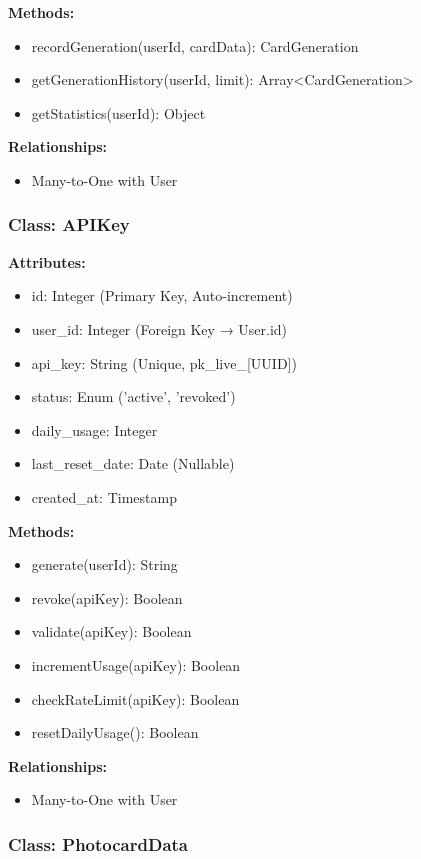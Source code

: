 \documentclass[12pt,a4paper]{article}
\begin{document}
\textbf{Methods:}
\begin{itemize}
    \item recordGeneration(userId, cardData): CardGeneration
    \item getGenerationHistory(userId, limit): Array<CardGeneration>
    \item getStatistics(userId): Object
\end{itemize}

\textbf{Relationships:}
\begin{itemize}
    \item Many-to-One with User
\end{itemize}

\subsubsection{Class: APIKey}

\textbf{Attributes:}
\begin{itemize}
    \item id: Integer (Primary Key, Auto-increment)
    \item user\_id: Integer (Foreign Key → User.id)
    \item api\_key: String (Unique, pk\_live\_[UUID])
    \item status: Enum ('active', 'revoked')
    \item daily\_usage: Integer
    \item last\_reset\_date: Date (Nullable)
    \item created\_at: Timestamp
\end{itemize}

\textbf{Methods:}
\begin{itemize}
    \item generate(userId): String
    \item revoke(apiKey): Boolean
    \item validate(apiKey): Boolean
    \item incrementUsage(apiKey): Boolean
    \item checkRateLimit(apiKey): Boolean
    \item resetDailyUsage(): Boolean
\end{itemize}

\textbf{Relationships:}
\begin{itemize}
    \item Many-to-One with User
\end{itemize}

\subsubsection{Class: PhotocardData}
\end{document}
